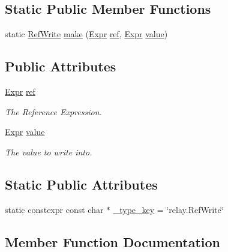 \subsection*{Static Public Member Functions}
\begin{DoxyCompactItemize}
\item 
static \hyperlink{classtvm_1_1relay_1_1RefWrite}{Ref\+Write} \hyperlink{classtvm_1_1relay_1_1RefWriteNode_a81879796bc363cbd4476956c9fc01c91}{make} (\hyperlink{namespacetvm_1_1relay_a5b84e3790f89bb3fad5c7911eeb99531}{Expr} \hyperlink{classtvm_1_1relay_1_1RefWriteNode_a5db6e4ad0056f5d15ffc69f6b7bdd68a}{ref}, \hyperlink{namespacetvm_1_1relay_a5b84e3790f89bb3fad5c7911eeb99531}{Expr} \hyperlink{classtvm_1_1relay_1_1RefWriteNode_a3f9952c82acd7f413188a9920b239e37}{value})
\end{DoxyCompactItemize}
\subsection*{Public Attributes}
\begin{DoxyCompactItemize}
\item 
\hyperlink{namespacetvm_1_1relay_a5b84e3790f89bb3fad5c7911eeb99531}{Expr} \hyperlink{classtvm_1_1relay_1_1RefWriteNode_a5db6e4ad0056f5d15ffc69f6b7bdd68a}{ref}
\begin{DoxyCompactList}\small\item\em The Reference Expression. \end{DoxyCompactList}\item 
\hyperlink{namespacetvm_1_1relay_a5b84e3790f89bb3fad5c7911eeb99531}{Expr} \hyperlink{classtvm_1_1relay_1_1RefWriteNode_a3f9952c82acd7f413188a9920b239e37}{value}
\begin{DoxyCompactList}\small\item\em The value to write into. \end{DoxyCompactList}\end{DoxyCompactItemize}
\subsection*{Static Public Attributes}
\begin{DoxyCompactItemize}
\item 
static constexpr const char $\ast$ \hyperlink{classtvm_1_1relay_1_1RefWriteNode_adec90b5a3c9a0ba2ff0d62c49e61a5b9}{\+\_\+type\+\_\+key} = \char`\"{}relay.\+Ref\+Write\char`\"{}
\end{DoxyCompactItemize}


\subsection{Member Function Documentation}
